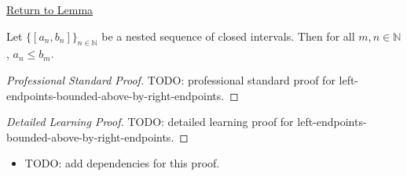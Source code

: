 \newpage
{}
\label{prf:left-endpoints-bounded-above-by-right-endpoints}

\begin{remark*}[Return]
\hyperref[lem:left-endpoints-bounded-above-by-right-endpoints]{Return to Lemma}
\end{remark*}

\begin{lemma*}
Let $\{[a_n,b_n]\}_{n\in\mathbb N}$ be a nested sequence of closed intervals.
Then for all $m,n\in\mathbb N$, $a_n\le b_m$.
\end{lemma*}

\begin{proof}[Professional Standard Proof]
\LRAProofBodyStart
TODO: professional standard proof for left-endpoints-bounded-above-by-right-endpoints.
\end{proof}

\begin{proof}[Detailed Learning Proof]
\LRAProofBodyStart
TODO: detailed learning proof for left-endpoints-bounded-above-by-right-endpoints.
\end{proof}

\begin{remark*}
\end{remark*}

\begin{dependencies}
\begin{itemize}
  \item TODO: add dependencies for this proof.
\end{itemize}
\end{dependencies}

\clearpage
